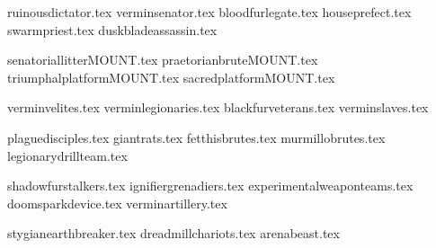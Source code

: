 
{ruinousdictator.tex}
{verminsenator.tex}
{bloodfurlegate.tex}
{houseprefect.tex}
{swarmpriest.tex}
{duskbladeassassin.tex}

\clearpage
{}
{senatoriallitterMOUNT.tex}
{praetorianbruteMOUNT.tex}
{triumphalplatformMOUNT.tex}
{sacredplatformMOUNT.tex}

\clearpage
{}
{verminvelites.tex}
{verminlegionaries.tex}
{blackfurveterans.tex}
{verminslaves.tex}

\clearpage
{}
{plaguedisciples.tex}
{giantrats.tex}
{fetthisbrutes.tex}
{murmillobrutes.tex}
{legionarydrillteam.tex}

\clearpage
{}
{shadowfurstalkers.tex}
{ignifiergrenadiers.tex}
{experimentalweaponteams.tex}
{doomsparkdevice.tex}
{verminartillery.tex}


\clearpage
{}
{stygianearthbreaker.tex}
{dreadmillchariots.tex}
{arenabeast.tex}
